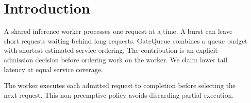 \section{Introduction}\label{sec:intro}
A shared inference worker processes one request at a time. A burst can leave
short requests waiting behind long requests. GateQueue combines a queue budget
with shortest-estimated-service ordering. The contribution is an explicit
admission decision before ordering work on the worker. We claim lower tail
latency at equal service coverage.

The worker executes each admitted request to completion before selecting the
next request. This non-preemptive policy avoids discarding partial execution.
